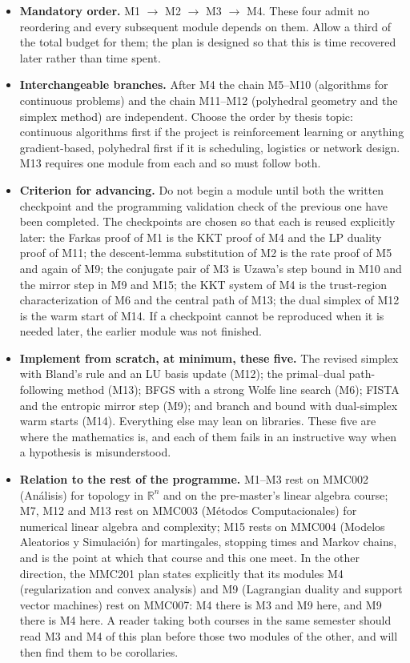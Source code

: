 \documentclass[11pt,a4paper]{article}
\begin{document}
\begin{itemize}
\item \textbf{Mandatory order.} M1 $\to$ M2 $\to$ M3 $\to$ M4. These four admit no reordering
and every subsequent module depends on them. Allow a third of the total budget for them; the
plan is designed so that this is time recovered later rather than time spent.

\item \textbf{Interchangeable branches.} After M4 the chain M5--M10 (algorithms for continuous
problems) and the chain M11--M12 (polyhedral geometry and the simplex method) are independent.
Choose the order by thesis topic: continuous algorithms first if the project is
reinforcement learning or anything gradient-based, polyhedral first if it is scheduling,
logistics or network design. M13 requires one module from each and so must follow both.

\item \textbf{Criterion for advancing.} Do not begin a module until both the written checkpoint
and the programming validation check of the previous one have been completed. The checkpoints
are chosen so that each is reused explicitly later: the Farkas proof of M1 is the KKT proof of
M4 and the LP duality proof of M11; the descent-lemma substitution of M2 is the rate proof of
M5 and again of M9; the conjugate pair of M3 is Uzawa's step bound in M10 and the mirror step
in M9 and M15; the KKT system of M4 is the trust-region characterization of M6 and the central
path of M13; the dual simplex of M12 is the warm start of M14. If a checkpoint cannot be
reproduced when it is needed later, the earlier module was not finished.

\item \textbf{Implement from scratch, at minimum, these five.} The revised simplex with Bland's
rule and an LU basis update (M12); the primal--dual path-following method (M13); BFGS with a
strong Wolfe line search (M6); FISTA and the entropic mirror step (M9); and branch and bound
with dual-simplex warm starts (M14). Everything else may lean on libraries. These five are
where the mathematics is, and each of them fails in an instructive way when a hypothesis is
misunderstood.

\item \textbf{Relation to the rest of the programme.} M1--M3 rest on MMC002 (An\'alisis) for
topology in $\mathbb{R}^n$ and on the pre-master's linear algebra course; M7, M12 and M13 rest
on MMC003 (M\'etodos Computacionales) for numerical linear algebra and complexity; M15 rests on
MMC004 (Modelos Aleatorios y Simulaci\'on) for martingales, stopping times and Markov chains,
and is the point at which that course and this one meet. In the other direction, the MMC201
plan states explicitly that its modules M4 (regularization and convex analysis) and M9
(Lagrangian duality and support vector machines) rest on MMC007: M4 there is M3 and M9 here,
and M9 there is M4 here. A reader taking both courses in the same semester should read M3 and
M4 of this plan before those two modules of the other, and will then find them to be
corollaries.


\end{itemize}
\end{document}
